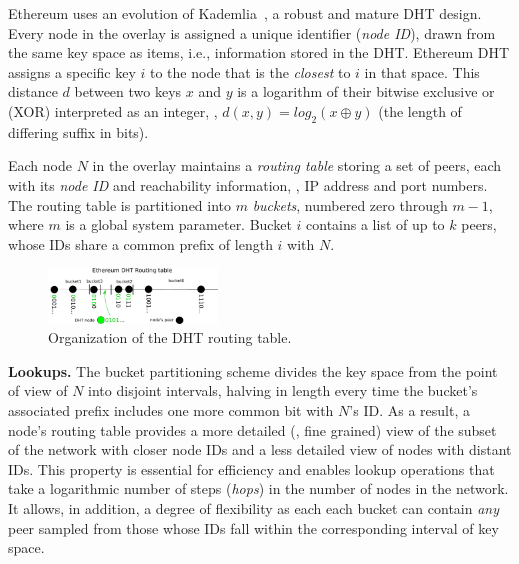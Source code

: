 Ethereum uses an evolution of Kademlia~\cite{maymounkov2002kademlia}, a robust and mature DHT design. %
Every node in the overlay is assigned a unique identifier (\emph{node ID}), drawn from the same key space as items, i.e., information stored in the DHT. %
Ethereum DHT assigns a specific key $i$ to the node that is the \emph{closest} to $i$ in that space.
This distance $d$ between two keys $x$ and $y$ is a logarithm of their bitwise exclusive or (XOR) interpreted as an integer, \ie, $d(x,y) = \textit{log}_2(x \oplus y)$ (\ie the length of differing suffix in bits).

Each node $N$ in the overlay maintains a \emph{routing table} storing a set of peers, each with its \emph{node ID} and reachability information, \ie, IP address and port numbers.
The routing table is partitioned into $m$ \textit{buckets}, numbered zero through $m-1$, where $m$ is a global system parameter.
Bucket $i$ contains a list of up to $k$ peers, whose IDs share a common prefix of length $i$ with $N$.


\begin{figure}
    \includegraphics[width=0.4\textwidth]{img/kademlia}
    \caption{Organization of the DHT routing table.}
    \label{fig:kademlia}
 \end{figure}

\smallskip
\noindent
\textbf{Lookups.}
%
The bucket partitioning scheme divides the key space from the point of view of $N$ into disjoint intervals, halving in length every time the bucket's associated prefix includes one more common bit with $N$'s ID.
As a result, a node's routing table provides a more detailed (\ie, fine grained) view of the subset of the network with closer node IDs and a less detailed view of nodes with distant IDs.
This property is essential for efficiency and enables lookup operations that take a logarithmic number of steps (\emph{hops}) in the number of nodes in the network.
It allows, in addition, a degree of flexibility as each each bucket can contain \textit{any} peer sampled from those whose IDs fall within the corresponding interval of key space.

